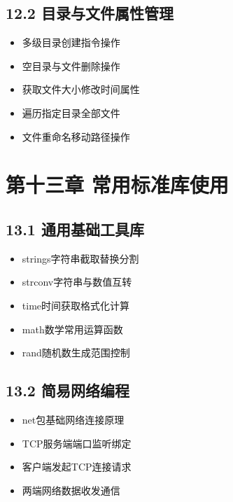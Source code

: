 \subsection{12.2 目录与文件属性管理}
\begin{itemize}
\item 多级目录创建指令操作
\item 空目录与文件删除操作
\item 获取文件大小修改时间属性
\item 遍历指定目录全部文件
\item 文件重命名移动路径操作
\end{itemize}

\section{第十三章 常用标准库使用}
\subsection{13.1 通用基础工具库}
\begin{itemize}
\item strings字符串截取替换分割
\item strconv字符串与数值互转
\item time时间获取格式化计算
\item math数学常用运算函数
\item rand随机数生成范围控制
\end{itemize}

\subsection{13.2 简易网络编程}
\begin{itemize}
\item net包基础网络连接原理
\item TCP服务端端口监听绑定
\item 客户端发起TCP连接请求
\item 两端网络数据收发通信
\end{itemize}
